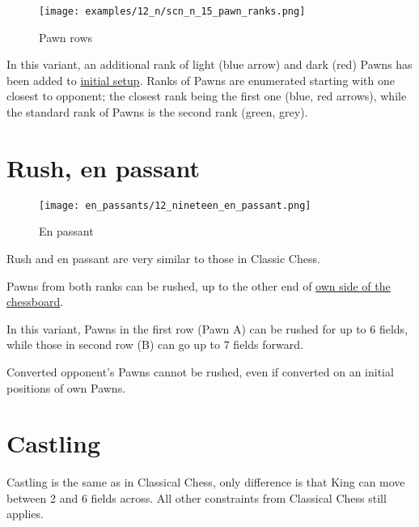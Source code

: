 \vspace*{-1.1\baselineskip}
\noindent
\begin{figure}[!h]
\texttt{[image: examples/12\_n/scn\_n\_15\_pawn\_ranks.png]}
\caption{Pawn rows}
\label{fig:scn_n_15_pawn_ranks}
\end{figure}

In this variant, an additional rank of light (blue arrow) and dark (red) Pawns has
been added to \hyperref[fig:12_nineteen]{initial setup}. Ranks of Pawns are enumerated
starting with one closest to opponent; the closest rank being the first one (blue,
red arrows), while the standard rank of Pawns is the second rank (green, grey).

\clearpage %

\section*{Rush, en passant}

\noindent
\begin{wrapfigure}[14]{l}{0.4\textwidth}
\centering
\texttt{[image: en\_passants/12\_nineteen\_en\_passant.png]}
\caption{En passant}
\label{fig:12_nineteen_en_passant}
\end{wrapfigure}
Rush and en passant are very similar to those in Classic Chess.

Pawns from both ranks can be rushed, up to the other end of
\hyperref[sec:Definitions/Sides of a chessboard]{own side of the chessboard}.

In this variant, Pawns in the first row (Pawn A) can be rushed for up to 6 fields,
while those in second row (B) can go up to 7 fields forward.

Converted opponent's Pawns cannot be rushed, even if converted on an initial positions
of own Pawns.

\clearpage %

\section*{Castling}

Castling is the same as in Classical Chess, only difference is that King can move between 2 and 6 fields across.
All other constraints from Classical Chess still applies.

